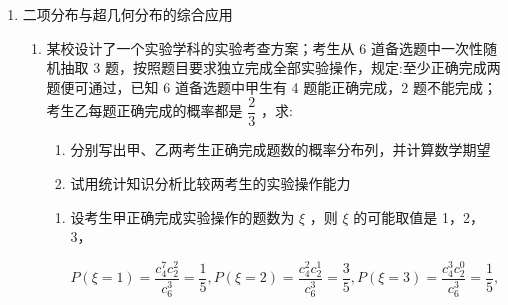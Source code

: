 \begin{enumerate}
\begin{enumerate}
\begin{jieda}
\begin{enumerate}
            \begin{center}
            \begin{tabular}{|c|c|c|c|c|}
            \hline
            $Y$ & 0 & 1 & 2 & 3 \\
            \cline{1-5}
            $P$ & $\dfrac{1}{120}$ & $\dfrac{7}{40}$ & $\dfrac{21}{40}$ & $\dfrac{7}{24}$ \\
            \cline{1-5}
            \hline
            \end{tabular}
            \end{center}
            
            均值为 $E\left( Y\right)  = 0 \times  \dfrac{1}{120} + 1 \times  \dfrac{7}{40} + 2 \times  \dfrac{21}{40} + 3 \times  \dfrac{7}{24} = \dfrac{21}{10}$ ,
            
            方差为 $D\left( Y\right)  = {\left( 0 - \dfrac{21}{10}\right) }^{2} \times  \dfrac{1}{120} + {\left( 1 - \dfrac{21}{10}\right) }^{2} \times  \dfrac{7}{40} + {\left( 2 - \dfrac{21}{10}\right) }^{2} \times  \dfrac{21}{40} + {\left( 3 - \dfrac{21}{10}\right) }^{2} \times  \dfrac{7}{24} = \dfrac{49}{100}$
        \end{enumerate}
    \end{jieda}
    \end{enumerate}
    \item 二项分布与超几何分布的综合应用
    \begin{enumerate}
    \item 某校设计了一个实验学科的实验考查方案；考生从 6 道备选题中一次性随机抽取 3 题，按照题目要求独立完成全部实验操作，规定:至少正确完成两题便可通过，已知 6 道备选题中甲生有 4 题能正确完成，2 题不能完成；考生乙每题正确完成的概率都是 $\dfrac{2}{3}$ ，求:
    \begin{enumerate}
        \item 分别写出甲、乙两考生正确完成题数的概率分布列，并计算数学期望
        \item 试用统计知识分析比较两考生的实验操作能力
    \end{enumerate}
    \begin{jieda}
        \begin{enumerate}
            \item 设考生甲正确完成实验操作的题数为 $\xi$ ，则 $\xi$ 的可能取值是 1，2，3，

            $P\left( {\xi  = 1}\right)  = \dfrac{{{c}}_{4}^{7}{{c}}_{2}^{2}}{{{c}}_{6}^{3}} = \dfrac{1}{5},P\left( {\xi  = 2}\right)  = \dfrac{{{c}}_{4}^{2}{{c}}_{2}^{1}}{{{c}}_{6}^{3}} = \dfrac{3}{5},P\left( {\xi  = 3}\right)  = \dfrac{{{c}}_{4}^{3}{{c}}_{2}^{0}}{{{c}}_{6}^{3}} = \dfrac{1}{5},$
            

\end{enumerate}
\end{jieda}
\end{enumerate}
\end{enumerate}
